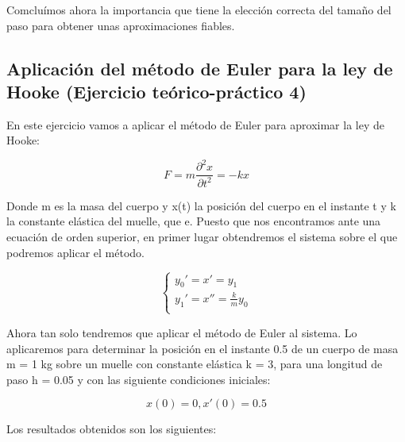 \documentclass[12pt]{article}       %
\begin{document}
Comcluímos ahora la importancia que tiene la elección correcta del tamaño del paso para obtener unas aproximaciones fiables. 

\subsection{Aplicación del método de Euler para la ley de Hooke (Ejercicio teórico-práctico 4)}
En este ejercicio vamos a aplicar el método de Euler para aproximar la ley de Hooke:

$$ F = m\frac{\partial^2x}{\partial t^2}=-kx$$

Donde m es la masa del cuerpo y x(t) la posición del cuerpo en el instante t y k la constante elástica del muelle, que e. Puesto que nos encontramos ante una ecuación de orden superior, en primer lugar obtendremos el sistema sobre el que podremos aplicar el método.

$$
\begin{cases}
y_0' = x' = y_1\\
y_1' = x'' = \frac{k}{m}y_0\\
\end{cases}
$$

Ahora tan solo tendremos que aplicar el método de Euler al sistema. Lo aplicaremos para determinar la posición en el instante 0.5 de un cuerpo de masa m = 1 kg sobre un muelle con constante elástica  k = 3, para una longitud de paso h = 0.05 y con las siguiente condiciones iniciales:

$$ x(0) = 0, x'(0) = 0.5 $$

Los resultados obtenidos son los siguientes:
\end{document}
